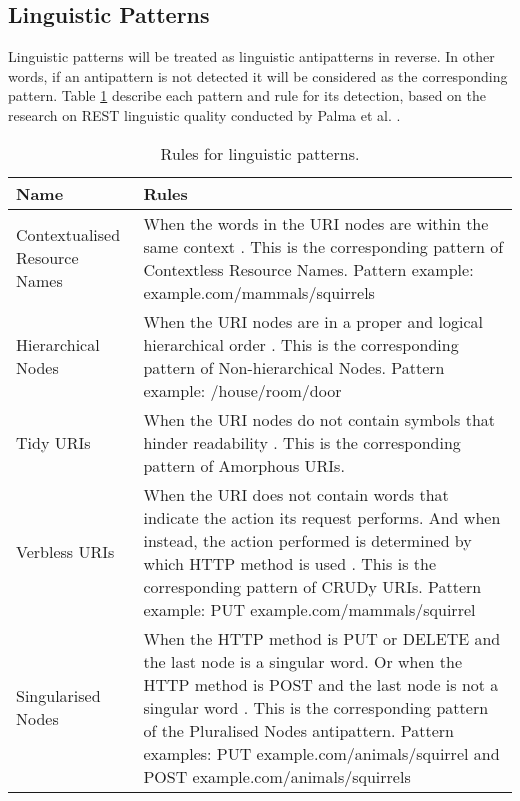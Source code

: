 \clearpage

\subsection{Linguistic Patterns}
\label{linguisticPatterns}

Linguistic patterns will be treated as linguistic antipatterns in reverse. In other words, if an antipattern is not detected it will be considered as the corresponding  pattern. Table \ref{tab:Rulesforlinguisticpatterns} describe each pattern and rule for its detection, based on the research on REST linguistic quality conducted by Palma et al. \cite{linguistic}.

\begin{center}
\begin{table}[!ht]
\small
\begin{tabular}{|p{30mm}|p{105mm}|}
\hline \textbf{Name} & \textbf{Rules} \\
\hline 
Contextualised Resource Names &
When the words in the URI nodes are within the same context \cite{linguistic}. This is the corresponding pattern of Contextless Resource Names. \newline Pattern example: 
example.com/mammals/squirrels\\ \hline
Hierarchical Nodes &
When the URI nodes are in a proper and logical hierarchical order \cite{linguistic}. This is the corresponding pattern of Non-hierarchical Nodes. \newline Pattern example: /house/room/door\\ \hline
Tidy URIs &
When the URI nodes do not contain symbols that hinder readability \cite{linguistic}. This is the corresponding pattern of Amorphous URIs.\\ \hline
Verbless URIs &
When the URI does not contain words that indicate the action its request performs. And when instead, the action performed is determined by which HTTP method is used \cite{linguistic}. This is the corresponding pattern of CRUDy URIs. \newline Pattern example: 
PUT example.com/mammals/squirrel\\ \hline
Singularised Nodes
&
When the HTTP method is PUT or DELETE and the last node is a singular word. Or when the HTTP method is POST and the last node is not a singular word \cite{linguistic}. This is the corresponding pattern of the Pluralised Nodes antipattern. \newline Pattern examples: PUT example.com/animals/squirrel and POST example.com/animals/squirrels\\ \hline
\end{tabular}
 \caption{Rules for linguistic patterns.}
 \label{tab:Rulesforlinguisticpatterns}
\end{table}
\end{center}

